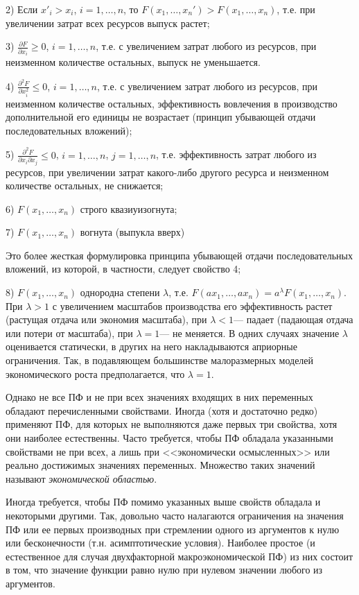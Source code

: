 \documentclass[12pt,openbib]{report}
\begin{document}
2) Если $x'_i>x_i$, $i=1,\dots,n$, то
$F(x_1,\dots,x_n')>F(x_1,\dots,x_n)$, т.е. при увеличении затрат
всех ресурсов выпуск растет;

3) $\frac{\partial F}{\partial x_i}\ge0$, $i=1,\dots,n$, т.е. с
увеличением затрат любого из ресурсов, при неизменном количестве
остальных, выпуск не уменьшается.

4) $\frac{\partial^2 F}{\partial x_i^2}\le0$, $i=1,\dots,n$, т.е. с
увеличением затрат любого из ресурсов, при неизменном количестве
остальных, эффективность вовлечения в производство дополнительной
его единицы не возрастает (принцип убывающей отдачи последовательных
вложений);

5) $\frac{\partial^2 F}{\partial x_i\partial x_j}\le0$,
$i=1,\dots,n$, $j=1,\dots,n$, т.е. эффективность затрат любого из
ресурсов, при увеличении затрат какого-либо другого ресурса и
неизменном количестве остальных, не снижается;

6) $F(x_1,\dots,x_n)$ строго квазиуизогнута;

7) $F(x_1,\dots,x_n)$ вогнута (выпукла вверх)

Это более жесткая формулировка принципа убывающей отдачи
последовательных вложений, из которой, в частности, следует свойство
4;

8) $F(x_1,\dots,x_n)$ однородна степени $\lambda$, т.е.
$F(ax_1,\dots,ax_n)=a^\lambda F(x_1,\dots,x_n)$. При $\lambda>1$ с
увеличением масштабов производства его эффективность растет
(растущая отдача или экономия масштаба), при $\lambda<1$--- падает
(падающая отдача или потери от масштаба), при $\lambda=1$--- не
меняется. В одних случаях значение $\lambda$ оценивается статически,
в других на него накладываются априорные ограничения. Так, в
подавляющем большинстве малоразмерных моделей экономического роста
предполагается, что $\lambda=1$.

Однако не все ПФ и не при всех значениях входящих в них переменных
обладают перечисленными свойствами. Иногда (хотя и достаточно редко)
применяют ПФ, для которых не выполняются даже первых три свойства,
хотя они наиболее естественны. Часто требуется, чтобы ПФ обладала
указанными свойствами не при всех, а лишь при <<экономически
осмысленных>> или реально достижимых значениях переменных. Множество
таких значений называют {\it экономической областью}.

Иногда требуется, чтобы ПФ помимо указанных выше свойств обладала и
некоторыми другими. Так, довольно часто налагаются ограничения на
значения ПФ или ее первых производных при стремлении одного из
аргументов к нулю или бесконечности (т.н. асимптотические условия).
Наиболее простое (и естественное для случая двухфакторной
макроэкономической ПФ) из них состоит в том, что значение функции
равно нулю при нулевом значении любого из аргументов.
\end{document}
